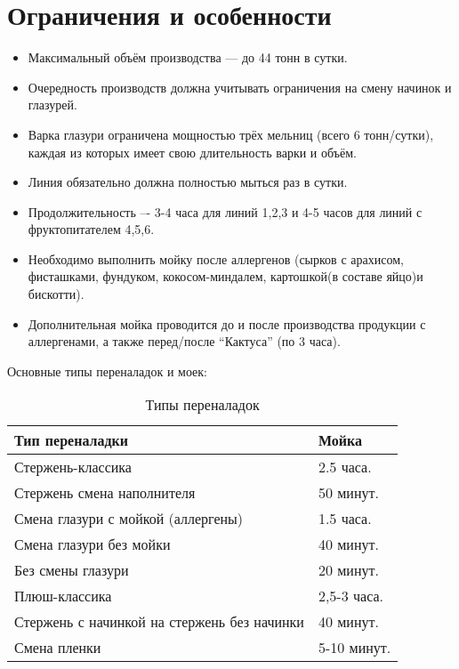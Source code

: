 \section{Ограничения и особенности}
\begin{itemize}
  \item Максимальный объём производства — до 44 тонн в сутки.
  \item Очередность производств должна учитывать ограничения на смену начинок и глазурей.
  \item Варка глазури ограничена мощностью трёх мельниц (всего 6 тонн/сутки), каждая из которых имеет свою длительность варки и объём.
  \item Линия обязательно должна полностью мыться раз в сутки.
  \item Продолжительность –- 3-4 часа для линий 1,2,3 и 4-5 часов для линий с фруктопитателем 4,5,6.
  \item Необходимо выполнить мойку после аллергенов (сырков с арахисом, фисташками, фундуком, кокосом-миндалем, картошкой(в составе яйцо)и бискотти).
  \item Дополнительная мойка проводится до и после производства продукции с аллергенами, а также перед/после ``Кактуса'' (по 3 часа).
\end{itemize}

Основные типы переналадок и моек:

\begin{table}[h]
\centering
\caption{Типы переналадок}
\begin{tabularx}{\textwidth}{|l|X|}
\hline
\textbf{Тип переналадки} & \textbf{Мойка} \\
\hline
Стержень-классика                                                    & 2.5 часа. \\
\hline
Стержень смена наполнителя                                           & 50 минут. \\
\hline
Смена глазури с мойкой (аллергены)                                   & 1.5 часа. \\
\hline
Смена глазури без мойки                                              & 40 минут. \\
\hline
Без смены глазури                                                    & 20 минут. \\
\hline
Плюш-классика                                                        &  2,5-3 часа.\\
\hline
Стержень с начинкой на стержень без начинки                          & 40 минут. \\
\hline
Смена пленки                                                         & 5-10 минут. \\
\hline
\end{tabularx}
\label{table:CleaningTimeBetweenProducts}
\end{table}

